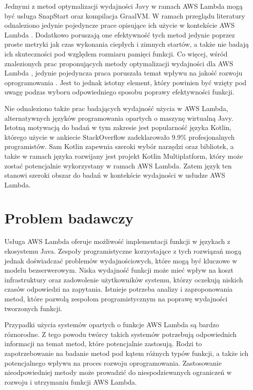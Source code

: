 Jednymi z metod optymalizacji wydajności Javy w ramach AWS Lambda mogą być usługa SnapStart oraz kompilacja GraalVM.
W ramach przeglądu literatury odnaleziono jedynie pojedyncze prace opisujące ich użycie w kontekście AWS Lambda \cite{menéndez2023performancebestpracticesusing}\cite{ritzal2020optimizing}.
Dodatkowo poruszają one efektywność tych metod jedynie poprzez proste metryki jak czas wykonania ciepłych i zimnych startów, a także nie badają ich skuteczności pod względem rozmiaru pamięci funkcji.
Co więcej, wśród znalezionych prac proponujących metody optymalizacji wydajności dla AWS Lambda \cite{8116416}\cite{10.1145/3377812.3382135}\cite{9860368}\cite{FerreiraDosSantos2023}\cite{10.1145/3458336.3465305}\cite{menéndez2023performancebestpracticesusing}\cite{ritzal2020optimizing},
jedynie pojedyncza praca poruszała temat wpływu na jakość rozwoju oprogramowania \cite{10.1145/3377812.3382135}.
Jest to jednak istotny element, który powinien być wzięty pod uwagę podzas wyboru odpowiedniego sposobu poprawy efektywności funkcji.

Nie odnaleziono także prac badających wydajność użycia w AWS Lambda, alternatywnych języków programowania opartych o maszynę wirtualną Javy.
Istotną motywacją do badań w tym zakresie jest popularność języka Kotlin, którego użycie w ankiecie StackOverflow \cite{stackoverflow_survey_2024} zadeklarowało 9.9\% profesjonalnych programistów.
Sam Kotlin zapewnia szeroki wybór narzędzi oraz bibliotek, a także w ramach języka rozwijany jest projekt Kotlin Multiplatform, który może zostać potencjalnie wykorzystany w ramach AWS Lambda.
Zatem język ten stanowi szeroki obszar do badań w kontekście wydajności w usłudze AWS Lambda.

\section*{Problem badawczy}\label{chapter:problem_badawczy}

Usługa AWS Lambda oferuje możliwość implementacji funkcji w językach z ekosystemu Java.
Zespoły programistyczne korzystające z tych rozwiązań mogą jednak doświadczać problemów wydajnościowych, które mogą być kluczowe w modelu bezserwerowym.
Niska wydajność funkcji może mieć wpływ na koszt infrastruktury oraz zadowolenie użytkowników systemu, którzy oczekują niskich czasów odpowiedzi na zapytania.
Istnieje potrzeba analizy i zaproponowania metod, które pozwolą zespołom programistycznym na poprawę wydajności tworzonych funkcji.

Przypadki użycia systemów opartych o funkcje AWS Lambda są bardzo róznorodne.
Z tego powodu twórcy takich systemów potrzebują odpowiednich informacji na temat metod, które potencjalnie zastosują.
Rodzi to zapotrzebowanie na badanie metod pod kątem różnych typów funkcji, a także ich potencjalnego wpływu na proces rozwoju oprogramowania.
Zastosowanie nieodpowiedniej metody może prowadzić do niespodziewanych ograniczeń w rozwoju i utrzymaniu funkcji AWS Lambda.

